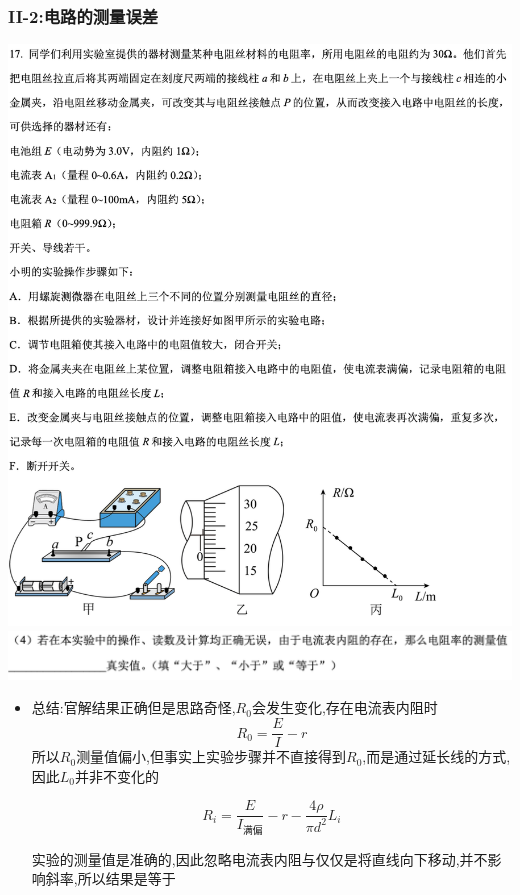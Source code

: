 \documentclass{article}
\begin{document}
\subsubsection{II-2:电路的测量误差}
\includegraphics[width=50em,keepaspectratio]{./pictures/1.3-3.png}  \\
\includegraphics[width=50em,keepaspectratio]{./pictures/1.3-4.png}

\begin{itemize}
    \item 总结:\quad 官解结果正确但是思路奇怪,$R_{0}$会发生变化,存在电流表内阻时
          $$
              R_{0} = \frac{E}{I} - r
          $$
          所以$R_{0}$测量值偏小,但事实上实验步骤并不直接得到$R_{0}$,而是通过延长线的方式,因此$L_{0}$并非不变化的

          $$
              R_{i} = \frac{E}{I_{满偏}} - r -\frac{4\rho}{\pi d^{2}} L_{i}
          $$

          实验的测量值是准确的,因此忽略电流表内阻与仅仅是将直线向下移动,并不影响斜率,所以结果是等于
\end{itemize}
\end{document}
